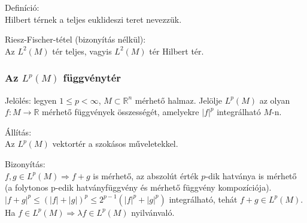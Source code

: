 \documentclass[12pt,a4paper]{scrartcl}
\newenvironment{definicio}{}{}
\newenvironment{tetel}{}{}
\newenvironment{bizonyitas}{}{}
\newenvironment{allitas}{}{}
\begin{document}
\begin{definicio}

Definíció:\\
Hilbert térnek a teljes euklideszi teret nevezzük.

\end{definicio}

\begin{tetel}

Riesz-Fischer-tétel (bizonyítás nélkül):\\
Az \(L^{2}\left( M \right)\) tér teljes, vagyis
\(L^{2}\left( M \right)\) tér Hilbert tér.

\end{tetel}

\hypertarget{az-lpleft-m-right-fuggvenyter}{%
\subsubsection{\texorpdfstring{Az \(L^{p}\left( M \right)\)
függvénytér}{Az L\^{}\{p\}\textbackslash{}left( M \textbackslash{}right) függvénytér}}\label{az-lpleft-m-right-fuggvenyter}}

Jelölés: legyen \(1 \leq p < \infty\), \(M \subset {\mathbb{R}}^{n}\)
mérhető halmaz. Jelölje \(L^{p}\left( M \right)\) az olyan
\(\left. f:M\rightarrow{\mathbb{R}} \right.\) mérhető függvények
összességét, amelyekre \(\left| f \right|^{p}\) integrálható \(M\)-n.

\begin{allitas}

Állítás:\\
Az \(L^{p}\left( M \right)\) vektortér a szokásos műveletekkel.

\end{allitas}

\begin{bizonyitas}

Bizonyítás:\\
\(\left. f,g \in L^{p}\left( M \right)\Rightarrow f + g \right.\) is
mérhető, az abszolút érték \(p\)-dik hatványa is mérhető (a folytonos
p-edik hatványfüggvény és mérhető függvény kompozíciója).
\(\left| {f + g} \right|^{p} \leq \left( {\left| f \right| + \left| g \right|} \right)^{p} \leq 2^{p - 1}\left( {\left| f \right|^{p} + \left| g \right|^{p}} \right)\)
integrálható, tehát \(f + g \in L^{p}\left( M \right)\). Ha
\(\left. f \in L^{p}\left( M \right)\Rightarrow\lambda f \in L^{p}\left( M \right) \right.\)
nyilvánvaló.

\end{bizonyitas}
\end{document}
